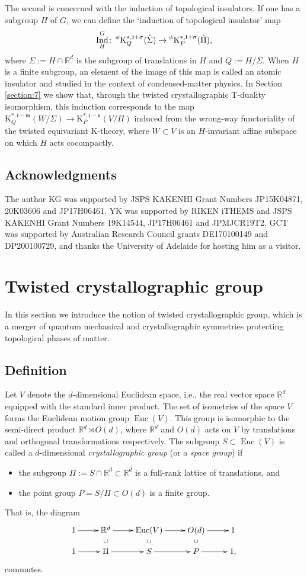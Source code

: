 \documentclass[11pt]{amsart}
\theoremstyle{definition}
\theoremstyle{plain}
\theoremstyle{remark}
\newcommand{\bR}{\mathbb{R}}
\newcommand{\ft}{\mathfrak{t}}
\newcommand{\fv}{\mathfrak{v}}
\newcommand{\fw}{\mathfrak{w}}
\newcommand{\K}{\mathrm{K}}%
\DeclareMathOperator{\Ind}{Ind}
\DeclareMathOperator{\Euc}{Euc}
\begin{document}
The second is concerned with the induction of topological insulators. If one has a subgroup $H$ of $G$, we can define the `induction of topological insulator' map 
\[\Ind_H^G \colon \prescript{\phi}{}{\K}_Q^{*,\ft+\sigma }(\hat{\Sigma }) \to \prescript{\phi}{}{\K}_P^{*,\ft+\sigma }(\hat{\Pi}), \]
where $\Sigma := H \cap \bR^d$ is the subgroup of translations in $H$ and $Q:=H/\Sigma$.
When $H$ is a finite subgroup, an element of the image of this map is called an atomic insulator and studied in the context of condensed-matter physics.
In Section \ref{section:7} we show that, through the twisted crystallographic T-duality isomorphism, this induction corresponds to the map $\K_Q^{*,\ft-\fw}(W/\Sigma) \to \K_P^{*,\ft-\fv}(V/\Pi)$ induced from the wrong-way functoriality of the twisted equivariant K-theory, where $W \subset V$ is an $H$-invariant affine subspace on which $H$ acts cocompactly.  




\subsection*{Acknowledgments}
The author KG was supported by JSPS KAKENHI Grant Numbers JP15K04871, 20K03606 and JP17H06461. YK was supported by RIKEN iTHEMS and JSPS KAKENHI Grant Numbers 19K14544, JP17H06461 and JPMJCR19T2. GCT was supported by Australian Research Council grants DE170100149 and DP200100729, and thanks the University of Adelaide for hosting him as a visitor.




\section{Twisted crystallographic group}\label{section:2}
In this section we introduce the notion of twisted crystallographic group, which is a merger of quantum mechanical and crystallographic symmetries protecting topological phases of matter.

\subsection{Definition}
Let $V$ denote the $d$-dimensional Euclidean space, i.e., the real vector space $\bR^d$ equipped with the standard inner product. The set of isometries of the space $V$ forms the Euclidean motion group $\Euc (V)$. This group is isomorphic to the semi-direct product $\bR ^d \rtimes O(d)$, where $\bR^d$ and $O(d)$ acts on $V$ by translations and orthogonal transformations respectively. 
The subgroup $S \subset \Euc(V)$ is called a $d$-dimensional \emph{crystallographic group} (or a \emph{space group}) if
\begin{itemize}
\item the subgroup $\Pi:=S \cap \bR^d \subset \bR^d$ is a full-rank lattice of translations, and
\item the point group $P = S/\Pi \subset O(d)$ is a finite group.
\end{itemize}
That is, the diagram
\[
\xymatrix@R=1em{
1 \ar[r] & \bR^d \ar[r]\ar@{}[d]|{\cup} & \Euc(V) \ar[r]\ar@{}[d]|{\cup} & O(d) \ar[r]\ar@{}[d]|{\cup} & 1 \\
1 \ar[r] & \Pi \ar[r] & S \ar[r] &P \ar[r] & 1,
}
\]
commutes.
\end{document}
